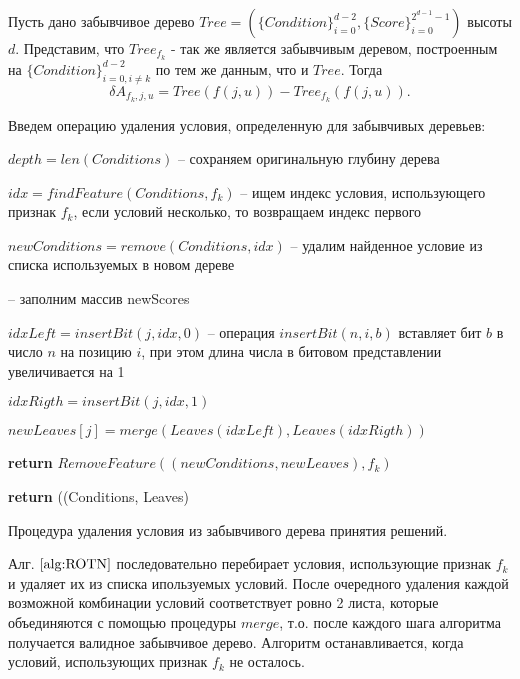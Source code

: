 \documentclass[12pt,a4paper]{report}
\begin{document}
Пусть дано забывчивое дерево $Tree = (\{Condition\}_{i=0}^{d - 2}, \{Score\}_{i=0}^{2^{d - 1} - 1})$ высоты $d$.
Представим, что $Tree_{f_k}$ - так же является забывчивым деревом, построенным на $\{Condition\}_{i=0, i \neq k}^{d - 2}$ по тем же данным, что и $Tree$. Тогда
\begin{equation*}
\delta A_{f_k, j, u} = Tree(f(j, u)) - Tree_{f_k}(f(j, u)).
\end{equation*}

Введем операцию удаления условия, определенную для забывчивых деревьев:

\begin{algorithm}[H]
\SetAlgoLined
{}
$depth = len(Conditions)$ -- сохраняем оригинальную глубину дерева

$idx = findFeature(Conditions, f_k)$ -- ищем индекс условия, использующего признак $f_k$, если условий несколько, то возвращаем индекс первого

 {
	$newConditions = remove(Conditions, idx)$ -- удалим найденное условие из списка используемых в новом дереве
	
	 { -- заполним массив newScores
	
		$idxLeft = insertBit(j, idx, 0)$ -- операция $insertBit(n, i, b)$ вставляет бит $b$ в число $n$ на позицию $i$, при этом длина числа в битовом представлении увеличивается на 1
		
		$idxRigth = insertBit(j, idx, 1)$
		
		$newLeaves[j] = merge(Leaves(idxLeft), Leaves(idxRigth))$
		
		\textbf{return} $RemoveFeature((newConditions, newLeaves), f_k)$
	}
} {
	\textbf{return} ((Conditions, Leaves)
}
\caption{Процедура удаления условия из забывчивого дерева принятия решений.}
\label{alg:ROTN}
\end{algorithm}

Алг. $\ref{alg:ROTN}$ последовательно перебирает условия, использующие признак $f_k$ и удаляет их из списка ипользуемых условий. После очередного удаления каждой возможной комбинации условий соответствует ровно 2 листа, которые объединяются с помощью процедуры $merge$, т.о. после каждого шага алгоритма получается валидное забывчивое дерево. Алгоритм останавливается, когда условий, использующих признак $f_k$ не осталось.
\end{document}
